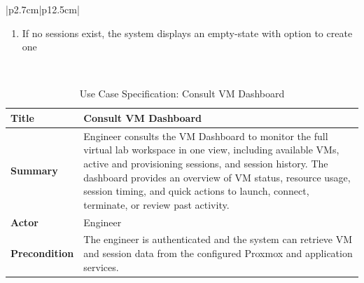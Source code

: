 \begin{table}[H]
\begin{tabular}{|p{2.7cm}|p{12.5cm}|}
\begin{minipage}[t]{\linewidth}
                                          \begin{enumerate}[topsep=0pt,itemsep=1pt,parsep=0pt,partopsep=0pt]
                                              \item If no sessions exist, the system displays an empty-state with option to create
                                                    one
                                          \end{enumerate}
                                      \end{minipage} \\
            \hline
        \end{tabular}
        \label{tab:eng-list-sessions}
    \end{table}
    \begin{table}[H]
        \centering
        \caption{Use Case Specification: Consult VM Dashboard}
        \begin{tabular}{|p{2.7cm}|p{12.5cm}|}
            \hline
            \textbf{Title}          & Consult VM Dashboard                                                                                                                                                                                                                                                                                                                 \\
            \hline
            \textbf{Summary}        & Engineer consults the VM Dashboard to monitor the full virtual lab workspace in one view, including available VMs, active and provisioning sessions, and session history. The dashboard provides an overview of VM status, resource usage, session timing, and quick actions to launch, connect, terminate, or review past activity. \\
            \hline
            \textbf{Actor}          & Engineer                                                                                                                                                                                                                                                                                                                             \\
            \hline
            \textbf{Precondition}   & The engineer is authenticated and the system can retrieve VM and session data from the configured Proxmox and application services.                                                                                                                                                                                                  \\

\end{tabular}
\end{table}

